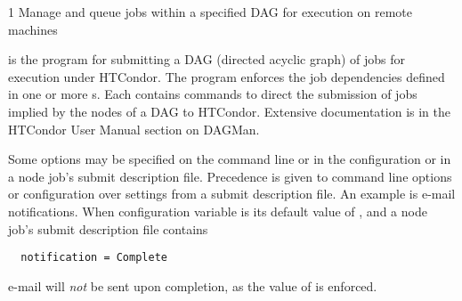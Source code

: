 \begin{ManPage}{\label{man-condor-submit-dag}}{1}
{Manage and queue jobs within a specified DAG for execution on remote machines}

\Synopsis
{}


\Description

 is the program for submitting a DAG (directed
acyclic graph) of jobs for execution under HTCondor.
The program enforces the job dependencies defined
in one or more s.
Each  contains commands
to direct the submission of jobs implied by the nodes
of a DAG to HTCondor.
Extensive documentation is in the HTCondor User Manual
section on DAGMan.

Some options may be specified on the command line
or in the configuration
or in a node job's submit description file.
Precedence is given to command line options or configuration
over settings from a submit description file.
An example is e-mail notifications.
When configuration variable 
is its default value of , 
and a node job's submit description file contains
\begin{verbatim}
  notification = Complete
\end{verbatim}
e-mail will \emph{not} be sent upon completion,
as the value of  is enforced.


\end{ManPage}
